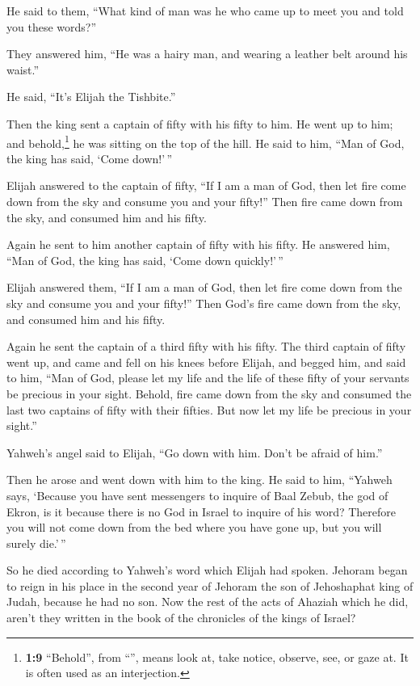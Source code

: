 \begin{paracol}{2}
\begin{otherlanguage}{english}
 He said to them, ``What kind of man was he who came up to
meet you and told you these words?''

 They answered him, ``He was a hairy man, and wearing a
leather belt around his waist.''

He said, ``It's Elijah the Tishbite.''

 Then the king sent a captain of fifty with his fifty to
him. He went up to him; and behold,\footnote{\textbf{1:9} ``Behold'',
  from ``'', means look at, take notice, observe, see, or
  gaze at. It is often used as an interjection.} he was sitting on the
top of the hill. He said to him, ``Man of God, the king has said, `Come
down!'\,''

 Elijah answered to the captain of fifty, ``If I am a man
of God, then let fire come down from the sky and consume you and your
fifty!'' Then fire came down from the sky, and consumed him and his
fifty.

 Again he sent to him another captain of fifty with his
fifty. He answered him, ``Man of God, the king has said, `Come down
quickly!'\,''

 Elijah answered them, ``If I am a man of God, then let
fire come down from the sky and consume you and your fifty!'' Then God's
fire came down from the sky, and consumed him and his fifty.

 Again he sent the captain of a third fifty with his
fifty. The third captain of fifty went up, and came and fell on his
knees before Elijah, and begged him, and said to him, ``Man of God,
please let my life and the life of these fifty of your servants be
precious in your sight.  Behold, fire came down from the
sky and consumed the last two captains of fifty with their fifties. But
now let my life be precious in your sight.''

 Yahweh's angel said to Elijah, ``Go down with him. Don't
be afraid of him.''

Then he arose and went down with him to the king.  He
said to him, ``Yahweh says, `Because you have sent messengers to inquire
of Baal Zebub, the god of Ekron, is it because there is no God in Israel
to inquire of his word? Therefore you will not come down from the bed
where you have gone up, but you will surely die.'\,''

 So he died according to Yahweh's word which Elijah had
spoken. Jehoram began to reign in his place in the second year of
Jehoram the son of Jehoshaphat king of Judah, because he had no son.
 Now the rest of the acts of Ahaziah which he did, aren't
they written in the book of the chronicles of the kings of Israel?


\end{otherlanguage}
\end{paracol}
